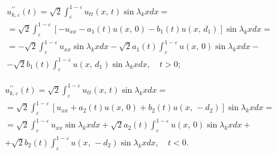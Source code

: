 \begin{multline}

u_{k,\varepsilon} ^{\prime \prime}(t)=

\sqrt{2}\int_\varepsilon^{1-\varepsilon} u_{tt}\left( {x,\,t}

\right)\sin {\lambda_{k}x}dx =

\\

= \sqrt{2}\int_\varepsilon^{1-\varepsilon} \left[ {- u_{xx} -

a_{1} (t)u\left( {x,\,0} \right)- b_{1} \left( {t}

\right)u\left( {x,\,d_{1}} \right)}\right] \sin {\lambda_{k}x}dx =

\\

= - \sqrt{2}\int_\varepsilon^{1-\varepsilon} u_{xx}\sin

{\lambda_{k}x}dx - \sqrt{2} a_{1}\left( {t}

\right)\int_\varepsilon^{1-\varepsilon}u\left( {x,\,0}

\right)\sin {\lambda_{k}x}dx -

\\

- \sqrt{2} b_{1}\left( {t}

\right)\int_\varepsilon^{1-\varepsilon}u\left( {x, \,

d_{1}} \right)\sin {\lambda_{k}x}dx, \quad t > 0;

\label{arkhip:eq8}

\end{multline}

\begin{multline}

u_{k,\varepsilon} ^{\prime \prime}(t)=

\sqrt{2}\int_\varepsilon^{1-\varepsilon} u_{tt}\left( {x,\,t}

\right)\sin {\lambda_{k}x}dx =

\\

= \sqrt{2}\int_\varepsilon^{1-\varepsilon} \left[ {u_{xx} +

a_{2} (t)u\left( {x,\,0} \right) + b_{2} (t)u\left( {x,\,- d_{2}} \right)}\right] \sin

{\lambda_{k}x}dx =

\\

= \sqrt{2}\int_\varepsilon^{1-\varepsilon} u_{xx}\sin

{\lambda_{k}x}dx + \sqrt{2} a_{2}\left( {t}

\right)\int_\varepsilon^{1-\varepsilon}u\left( {x,\,0}

\right)\sin {\lambda_{k}x}dx +

\\

+ \sqrt{2} b_{2}\left( {t}

\right)\int_\varepsilon^{1-\varepsilon}u\left( {x, \,

- d_{2}} \right)\sin {\lambda_{k}x}dx, \quad t < 0.

\label{arkhip:eq9}

\end{multline}



